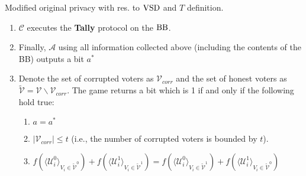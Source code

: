 \begin{definition}{ Modified original privacy with res. to $\operatorname{VSD}$ and $T$ definition.}
\begin{enumerate}
\begin{enumerate}
\end{enumerate}
\item $\mathcal{C}$ executes the \textbf{Tally} protocol on the $\operatorname{BB}$. 
\item Finally, $\mathcal{A}$ using all information collected above (including the contents of the BB) outputs a bit $a^*$
\item Denote the set of corrupted voters as $\mathcal{V}_{corr}$ and the set of honest voters as $\tilde{\mathcal{V}}= \mathcal{V} \backslash \mathcal{V}_{corr}$. The game returns a bit which is 1 if and only if the following hold true:
\begin{enumerate}
 \item $a = a^*$
 \item $|\mathcal{V}_{corr}| \leq t$ (i.e., the number of corrupted voters is bounded by $t$).
 \item $f(\langle \mathcal{U}^0_i \rangle _{V_i \in \tilde{\mathcal{V}}^0} ) + f(\langle \mathcal{U}^1_i \rangle _{V_i \in \tilde{\mathcal{V}}^1} ) =  f(\langle \mathcal{U}^0_i \rangle _{V_i \in \tilde{\mathcal{V}}^1} ) +  f(\langle \mathcal{U}^1_i \rangle _{V_i \in \tilde{\mathcal{V}}^0} )$
\end{enumerate}
\end{enumerate}
\end{definition}
 
